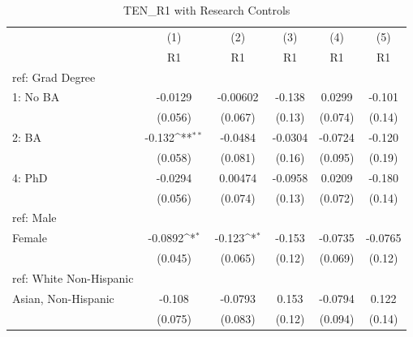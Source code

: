 \begin{table}[htbp]\centering
\def\sym#1{\ifmmode^{#1}\else\(^{#1}\)\fi}
\caption{TEN\_R1 with Research Controls \label{tab1}}
\begin{tabular}{l*{5}{c}}
\hline\hline
  &\multicolumn{1}{c}{(1)}         &\multicolumn{1}{c}{(2)}         &\multicolumn{1}{c}{(3)}         &\multicolumn{1}{c}{(4)}         &\multicolumn{1}{c}{(5)}         \\
  &          R1         &          R1         &          R1         &          R1         &          R1         \\
\hline
ref: Grad Degree&                     &                     &                     &                     &                     \\
[1em]
1: No BA&     -0.0129         &    -0.00602         &      -0.138         &      0.0299         &      -0.101         \\
  &     (0.056)         &     (0.067)         &      (0.13)         &     (0.074)         &      (0.14)         \\
[1em]
2: BA&      -0.132\sym{**} &     -0.0484         &     -0.0304         &     -0.0724         &      -0.120         \\
  &     (0.058)         &     (0.081)         &      (0.16)         &     (0.095)         &      (0.19)         \\
[1em]
4: PhD&     -0.0294         &     0.00474         &     -0.0958         &      0.0209         &      -0.180         \\
  &     (0.056)         &     (0.074)         &      (0.13)         &     (0.072)         &      (0.14)         \\
[1em]
ref: Male&                     &                     &                     &                     &                     \\
[1em]
Female&     -0.0892\sym{*}  &      -0.123\sym{*}  &      -0.153         &     -0.0735         &     -0.0765         \\
  &     (0.045)         &     (0.065)         &      (0.12)         &     (0.069)         &      (0.12)         \\
[1em]
ref: White Non-Hispanic&                     &                     &                     &                     &                     \\
[1em]
Asian, Non-Hispanic&      -0.108         &     -0.0793         &       0.153         &     -0.0794         &       0.122         \\
  &     (0.075)         &     (0.083)         &      (0.12)         &     (0.094)         &      (0.14)         \\

\end{tabular}
\end{table}
